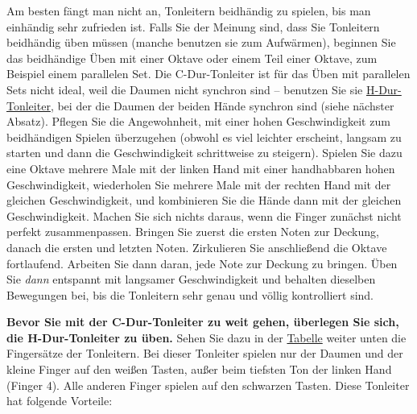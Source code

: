 Am besten fängt man nicht an, Tonleitern beidhändig zu spielen, bis man einhändig sehr zufrieden ist.
Falls Sie der Meinung sind, dass Sie Tonleitern beidhändig üben müssen (manche benutzen sie zum Aufwärmen), beginnen Sie das beidhändige Üben mit einer Oktave oder einem Teil einer Oktave, zum Beispiel einem parallelen Set.
Die C-Dur-Tonleiter ist für das Üben mit parallelen Sets nicht ideal, weil die Daumen nicht synchron sind -- benutzen Sie sie \hyperref[hdur]{H-Dur-Tonleiter}, bei der die Daumen der beiden Hände synchron sind (siehe nächster Absatz).
Pflegen Sie die Angewohnheit, mit einer hohen Geschwindigkeit zum beidhändigen Spielen überzugehen (obwohl es viel leichter erscheint, langsam zu starten und dann die Geschwindigkeit schrittweise zu steigern).
Spielen Sie dazu eine Oktave mehrere Male mit der linken Hand mit einer handhabbaren hohen Geschwindigkeit, wiederholen Sie mehrere Male mit der rechten Hand mit der gleichen Geschwindigkeit, und kombinieren Sie die Hände dann mit der gleichen Geschwindigkeit.
Machen Sie sich nichts daraus, wenn die Finger zunächst nicht perfekt zusammenpassen.
Bringen Sie zuerst die ersten Noten zur Deckung, danach die ersten und letzten Noten.
Zirkulieren Sie anschließend die Oktave fortlaufend.
Arbeiten Sie dann daran, jede Note zur Deckung zu bringen.
Üben Sie \textit{dann} entspannt mit langsamer Geschwindigkeit und behalten dieselben Bewegungen bei, bis die Tonleitern sehr genau und völlig kontrolliert sind.


\label{hdur}

\textbf{Bevor Sie mit der C-Dur-Tonleiter zu weit gehen, überlegen Sie sich, die H-Dur-Tonleiter zu üben.}
Sehen Sie dazu in der \hyperref[table]{Tabelle} weiter unten die Fingersätze der Tonleitern.
Bei dieser Tonleiter spielen nur der Daumen und der kleine Finger auf den weißen Tasten, außer beim tiefsten Ton der linken Hand (Finger 4).
Alle anderen Finger spielen auf den schwarzen Tasten.
Diese Tonleiter hat folgende Vorteile:

